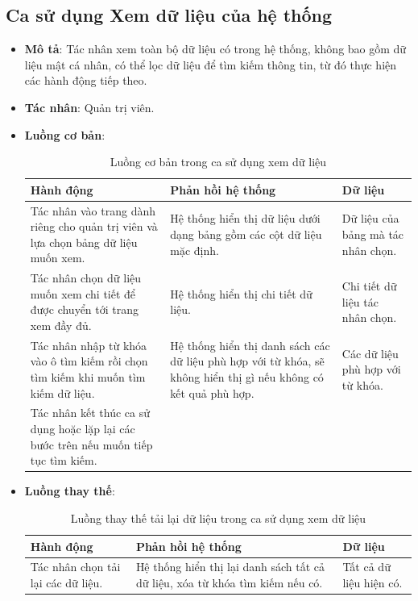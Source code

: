 \documentclass[./../main.tex]{subfiles}
\begin{document}
\subsection{Ca sử dụng Xem dữ liệu của hệ thống}
\begin{itemize}
    \item \textbf{Mô tả}: Tác nhân xem toàn bộ dữ liệu có trong hệ thống, không bao gồm dữ liệu mật cá nhân, có thể lọc dữ liệu để tìm kiếm thông tin, từ đó thực hiện các hành động tiếp theo.
    \item \textbf{Tác nhân}: Quản trị viên.
    \item \textbf{Luồng cơ bản}:
    \begin{table}[H]
    \caption{\label{uc-43}Luồng cơ bản trong ca sử dụng xem dữ liệu}
    \begin{tabularx}{\textwidth}{| X | X | X |}
        \hline
        \textbf{Hành động} & \textbf{Phản hồi hệ thống} & \textbf{Dữ liệu} 
        \\ \hline
         Tác nhân vào trang dành riêng cho quản trị viên và lựa chọn bảng dữ liệu muốn xem. & Hệ thống hiển thị dữ liệu dưới dạng bảng gồm các cột dữ liệu mặc định. & Dữ liệu của bảng mà tác nhân chọn.
        \\ \hline
        Tác nhân chọn dữ liệu muốn xem chi tiết để được chuyển tới trang xem đầy đủ. & Hệ thống hiển thị chi tiết dữ liệu. & Chi tiết dữ liệu tác nhân chọn.
        \\ \hline
        Tác nhân nhập từ khóa vào ô tìm kiếm rồi chọn tìm kiếm khi muốn tìm kiếm dữ liệu. & Hệ thống hiển thị danh sách các dữ liệu phù hợp với từ khóa, sẽ không hiển thị gì nếu không có kết quả phù hợp. & Các dữ liệu phù hợp với từ khóa.
        \\ \hline
        Tác nhân kết thúc ca sử dụng hoặc lặp lại các bước trên nếu muốn tiếp tục tìm kiếm. & &
        \\ \hline
    \end{tabularx}
    \end{table}    
    \item \textbf{Luồng thay thế}: 
        \begin{table}[H]
        \caption{\label{uc-44}Luồng thay thế tải lại dữ liệu trong ca sử dụng xem dữ liệu}
        \begin{tabularx}{\textwidth}{| X | X | X |}
            \hline
            \textbf{Hành động} & \textbf{Phản hồi hệ thống} & \textbf{Dữ liệu} \\ \hline
            Tác nhân chọn tải lại các dữ liệu. & Hệ thống hiển thị lại danh sách tất cả dữ liệu, xóa từ khóa tìm kiếm nếu có. & Tất cả dữ liệu hiện có. 

\end{tabularx}
\end{table}
\end{itemize}
\end{document}
